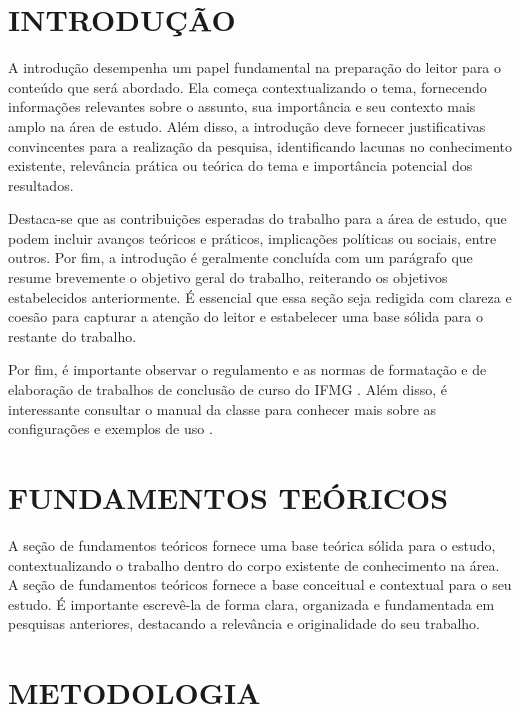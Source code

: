 \documentclass[atividade]{iftex2024}
\begin{document}
\maketitle

\chapter{INTRODUÇÃO}

A introdução desempenha um papel fundamental na preparação do leitor para o conteúdo que será abordado.
Ela começa contextualizando o tema, fornecendo informações relevantes sobre o assunto, sua importância e seu contexto mais amplo na área de estudo.
Além disso, a introdução deve fornecer justificativas convincentes para a realização da pesquisa, identificando lacunas no conhecimento existente, relevância prática ou teórica do tema e importância potencial dos resultados.

Destaca-se que as contribuições esperadas do trabalho para a área de estudo, que podem incluir avanços teóricos e práticos, implicações políticas ou sociais, entre outros.
Por fim, a introdução é geralmente concluída com um parágrafo que resume brevemente o objetivo geral do trabalho, reiterando os objetivos estabelecidos anteriormente.
É essencial que essa seção seja redigida com clareza e coesão para capturar a atenção do leitor e estabelecer uma base sólida para o restante do trabalho.

Por fim, é importante observar o regulamento e as normas de formatação e de elaboração de trabalhos de conclusão de curso do IFMG \cite{ifmg:2020:manual,ifmg:2021:tcc}.
Além disso, é interessante consultar o manual da classe \iftex para conhecer mais sobre as configurações e exemplos de uso \cite{ribeiro:2024:iftex}.

\chapter{FUNDAMENTOS TEÓRICOS}

A seção de fundamentos teóricos fornece uma base teórica sólida para o estudo, contextualizando o trabalho dentro do corpo existente de conhecimento na área.
A seção de fundamentos teóricos fornece a base conceitual e contextual para o seu estudo.
É importante escrevê-la de forma clara, organizada e fundamentada em pesquisas anteriores, destacando a relevância e originalidade do seu trabalho.

\chapter{METODOLOGIA}
\end{document}
